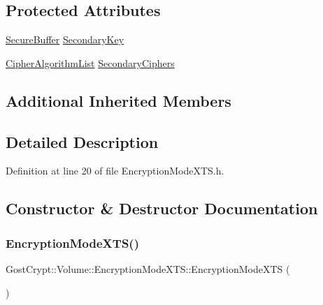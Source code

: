 \subsection*{Protected Attributes}
\begin{DoxyCompactItemize}
\item 
\hyperlink{class_gost_crypt_1_1_secure_buffer}{Secure\+Buffer} \hyperlink{class_gost_crypt_1_1_volume_1_1_encryption_mode_x_t_s_afcdb3374f093c1bb21f5def339769c5e}{Secondary\+Key}
\item 
\hyperlink{namespace_gost_crypt_1_1_volume_ad32c730cdf3a63d2bafbac0f63f0740f}{Cipher\+Algorithm\+List} \hyperlink{class_gost_crypt_1_1_volume_1_1_encryption_mode_x_t_s_a253c07bdae8f18ea65c7683353c9c34f}{Secondary\+Ciphers}
\end{DoxyCompactItemize}
\subsection*{Additional Inherited Members}


\subsection{Detailed Description}


Definition at line 20 of file Encryption\+Mode\+X\+T\+S.\+h.



\subsection{Constructor \& Destructor Documentation}
\mbox{\label{class_gost_crypt_1_1_volume_1_1_encryption_mode_x_t_s_aec865043f40cb3aff76e0254df5fec93}} 
\subsubsection{\texorpdfstring{Encryption\+Mode\+X\+T\+S()}{EncryptionModeXTS()}}
{\footnotesize\ttfamily Gost\+Crypt\+::\+Volume\+::\+Encryption\+Mode\+X\+T\+S\+::\+Encryption\+Mode\+X\+TS (\begin{DoxyParamCaption}{ }\end{DoxyParamCaption})\hspace{0.3cm}{\ttfamily [inline]}}




